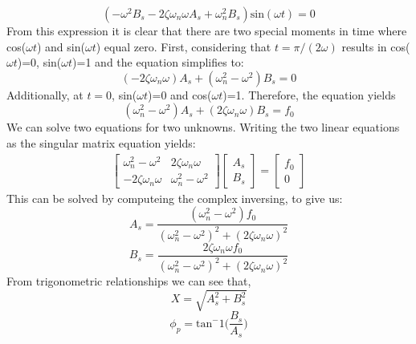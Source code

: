 \documentclass[12pt,letter]{article}
\numberwithin{ex}{section} %
\numberwithin{re}{section} %
\begin{document}
			\begin{equation*}
				(-\omega^2 B_s - 2 \zeta \omega_n \omega A_s + \omega_n^2 B_s)\text{sin}(\omega t) =0
			\end{equation*}	
			From this expression it is clear that there are two special moments in time where cos($\omega t$) and sin($\omega t$) equal zero. First, considering that $t=\pi/(2\omega)$ results in cos($\omega t$)=0, sin($\omega t$)=1 and the equation simplifies to:
			\begin{equation}
				(-2\zeta \omega_n \omega)A_s + (\omega_n^2 - \omega^2)B_s = 0
			\end{equation}	
			Additionally, at $t=0$, sin($\omega t$)=0 and cos($\omega t$)=1. Therefore, the equation yields		
			\begin{equation}
				(\omega_n^2 - \omega^2)A_s + (2\zeta \omega_n \omega)B_s = f_0
			\end{equation}				
			We can solve two equations for two unknowns. Writing the two linear equations as the singular matrix equation yields:
			\begin{gather}
			   \begin{bmatrix}
			   \omega_n^2 - \omega^2 & 2\zeta \omega_n \omega \\
			   - 2\zeta \omega_n \omega &  \omega_n^2 - \omega^2
			   \end{bmatrix}
  			   \begin{bmatrix}
  			   A_s \\
  			   B_s
  			   \end{bmatrix}
			 = \begin{bmatrix} f_0 \\ 0
			 \end{bmatrix}
			\end{gather}
			This can be solved by computeing the complex inversing, to give us:
			\begin{equation}
				A_s = \frac{(\omega_n^2 - \omega^2)f_0}{(\omega_n^2 - \omega^2)^2 +  (2\zeta \omega_n \omega)^2}
			\end{equation}	
			\begin{equation}
				B_s = \frac{2\zeta \omega_n \omega f_0}{(\omega_n^2 - \omega^2)^2 +  (2\zeta \omega_n \omega)^2}
			\end{equation}	
			From trigonometric relationships we can see that, 
			\begin{equation}
				X = \sqrt{A_s^2 + B_s^2}
			\end{equation}	
			\begin{equation}
				\phi_p = \text{tan}^-1\bigg(\frac{B_s}{A_s}\bigg)
			\end{equation}	
\end{document}
